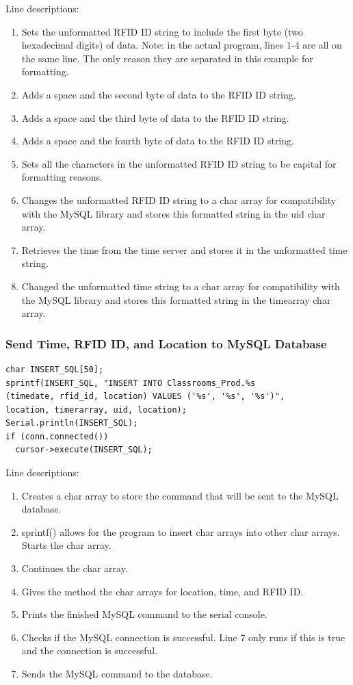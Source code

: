 \documentclass[12pt]{article}
\begin{document}
\begin{spacing}{1.2}
Line descriptions:
\begin{enumerate}
	\item Sets the unformatted RFID ID string to include the first byte (two hexadecimal digits) of data. Note: in the actual program, lines 1-4 are all on the same line. The only reason they are separated in this example for formatting.
	\item Adds a space and the second byte of data to the RFID ID string.
	\item Adds a space and the third byte of data to the RFID ID string.
	\item Adds a space and the fourth byte of data to the RFID ID string.
	\item Sets all the characters in the unformatted RFID ID string to be capital for formatting reasons.
	\item Changes the unformatted RFID ID string to a char array for compatibility with the MySQL library and stores this formatted string in the uid char array.
	\item Retrieves the time from the time server and stores it in the unformatted time string.
	\item Changed the unformatted time string to a char array for compatibility with the MySQL library and stores this formatted string in the timearray char array.
\end{enumerate}

\subsubsection{Send Time, RFID ID, and Location to MySQL Database}

\begin{lstlisting}[language=Arduino]
char INSERT_SQL[50];
sprintf(INSERT_SQL, "INSERT INTO Classrooms_Prod.%s 
(timedate, rfid_id, location) VALUES ('%s', '%s', '%s')", 
location, timerarray, uid, location);
Serial.println(INSERT_SQL);
if (conn.connected())
  cursor->execute(INSERT_SQL);
\end{lstlisting}

Line descriptions:
\begin{enumerate}
	\item Creates a char array to store the command that will be sent to the MySQL database.
	\item sprintf() allows for the program to insert char arrays into other char arrays. Starts the char array.
	\item Continues the char array.
	\item Gives the method the char arrays for location, time, and RFID ID.
	\item Prints the finished MySQL command to the serial console.
	\item Checks if the MySQL connection is successful. Line 7 only runs if this is true and the connection is successful.
	\item Sends the MySQL command to the database.
\end{enumerate}


\end{spacing}
\end{document}
